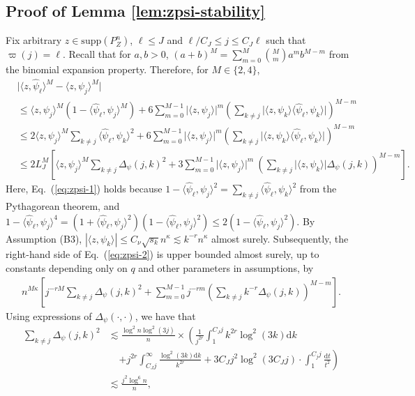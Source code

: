 \documentclass[11pt,a4paper]{article}
\renewcommand{\hat}{\widehat}
\theoremstyle{definition}
\theoremstyle{plain}
\theoremstyle{remark}
\newcommand{\supp}{\mathrm{supp}}
\newcommand{\ud}{\mathrm d}
\begin{document}
\subsection{Proof of Lemma \ref{lem:zpsi-stability}}
Fix arbitrary $z\in\supp(P_Z^n)$, $\ell\leq J$ and $\ell/C_J\leq j\leq C_J\ell$ such that $\varpi(j)=\ell$. 
Recall that for $a,b>0$, $(a+b)^M = \sum_{m=0}^M \binom{M}{m}a^mb^{M-m}$ from the binomial expansion property.
Therefore, for $M\in\{2,4\}$, 
\begin{align}
&\big|\langle z,\hat\psi_\ell\rangle^M-\langle z,\psi_j\rangle^M\big|\nonumber\\
& \leq \langle z,\psi_j\rangle^M(1-\langle\hat\psi_\ell,\psi_j\rangle^M) + 6\sum_{m=0}^{M-1}\big|\langle z,\psi_j\rangle\big|^m\left(\sum_{k\neq j}\big|\langle z,\psi_k\rangle\langle\hat\psi_\ell,\psi_k\rangle\big|\right)^{M-m}\nonumber\\
&\leq 2\langle z,\psi_j\rangle^M\sum_{k\neq j}\langle\hat\psi_\ell,\psi_k\rangle^2 +  6\sum_{m=0}^{M-1}\big|\langle z,\psi_j\rangle\big|^m\left(\sum_{k\neq j}\big|\langle z,\psi_k\rangle\langle\hat\psi_\ell,\psi_k\rangle\big|\right)^{M-m}\label{eq:zpsi-1}\\
&\leq 2L_J^M\left[\langle z,\psi_j\rangle^M\sum_{k\neq j}\Delta_\psi(j,k)^2 +3\sum_{m=0}^{M-1}\big|\langle z,\psi_j\rangle\big|^m\ \left(\sum_{k\neq j}\big|\langle z,\psi_k\rangle\big|\Delta_\psi(j,k)\right)^{M-m} \right].\label{eq:zpsi-2}
\end{align}
Here, Eq.~(\ref{eq:zpsi-1}) holds because $1-\langle\hat\psi_\ell,\psi_j\rangle^2=\sum_{k\neq j}\langle\hat\psi_\ell,\psi_k\rangle^2$ from the Pythagorean theorem,
and $1-\langle\hat\psi_\ell,\psi_j\rangle^4 = (1+\langle\hat\psi_\ell,\psi_j\rangle^2)(1-\langle\hat\psi_\ell,\psi_j\rangle^2) \leq 2(1-\langle\hat\psi_\ell,\psi_j\rangle^2)$. 
By Assumption (B3), $|\langle z,\psi_k\rangle|\leq C_\nu\sqrt{s_k}n^{\kappa} \lesssim k^{-r}n^{\kappa}$ almost surely.
Subsequently, the right-hand side of Eq.~(\ref{eq:zpsi-2}) is upper bounded almost surely, up to constants depending only on $q$ and other parameters in assumptions, by
\begin{align}
 n^{M\kappa}\left[j^{-rM}\sum_{k\neq j}\Delta_\psi(j,k)^2 + \sum_{m=0}^{M-1} j^{-rm}\left(\sum_{k\neq j}k^{-r}\Delta_\psi(j,k)\right)^{M-m} \right].
 \label{eq:zpsi-3}
\end{align}
Using expressions of $\Delta_\psi(\cdot,\cdot)$, we have that
\begin{align}
\sum_{k\neq j}\Delta_\psi(j,k)^2 &\lesssim \frac{\log^2 n\log^2(3j)}{n}\times \left( \frac{1}{j^{2r}}\int_1^{C_J j} k^{2r}\log^2(3k)\ud k \right.\nonumber\\
&\;\;\;\;\left.+ j^{2r}\int_{C_J j}^{\infty}\frac{\log^2(3k)\ud k}{k^{2r}} + 3C_J j^2\log^2(3C_Jj)\cdot \int_1^{C_j j}\frac{\ud t}{t^2}\right)\nonumber\\
&\lesssim \frac{j^2\log^6 n}{n},\label{eq:zpsi-4}
\end{align}
\end{document}
